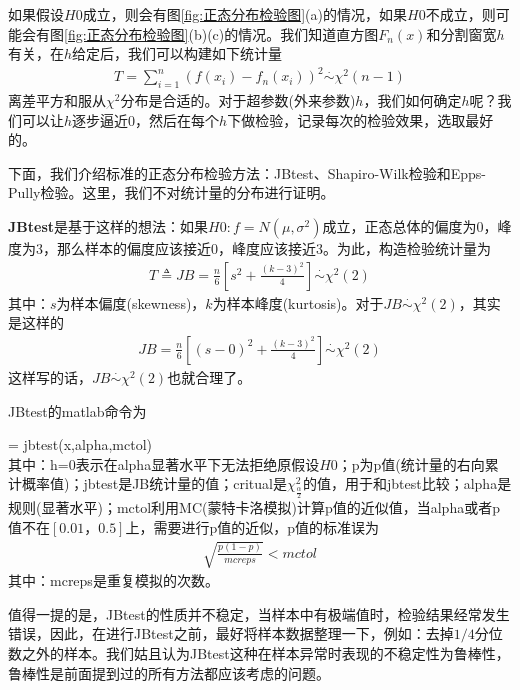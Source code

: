         如果假设$H0$成立，则会有图\ref{fig:正态分布检验图}(a)的情况，如果$H0$不成立，则可能会有图\ref{fig:正态分布检验图}(b)(c)的情况。我们知道直方图$F_n(x)$和分割窗宽$h$有关，在$h$给定后，我们可以构建如下统计量
        \begin{align*}
        T = \sum_{i = 1}^n \left( f(x_i) - f_n(x_i) \right) ^2 \overset{\cdot}{\sim} \chi^2(n-1)
        \end{align*}
        离差平方和服从$\chi^2$分布是合适的。对于超参数(外来参数)$h$，我们如何确定$h$呢？我们可以让$h$逐步逼近0，然后在每个$h$下做检验，记录每次的检验效果，选取最好的。
        \par
        下面，我们介绍标准的正态分布检验方法：JBtest、Shapiro-Wilk检验和Epps-Pully检验。这里，我们不对统计量的分布进行证明。
        \par
        \textbf{JBtest}是基于这样的想法：如果$H0:f = N(\mu,\sigma^2)$成立，正态总体的偏度为0，峰度为3，那么样本的偏度应该接近0，峰度应该接近3。为此，构造检验统计量为
        \begin{align*}
        T \triangleq JB = \frac{n}{6}\left[ s^2+\frac{(k-3)^2}{4}  \right] \overset{\cdot}{\sim} \chi^2(2)
        \end{align*}
        其中：$s$为样本偏度(skewness)，$k$为样本峰度(kurtosis)。对于$JB\overset{\cdot}{\sim} \chi^2(2)$，其实是这样的
        \begin{align*}
        JB = \frac{n}{6}\left[ (s-0)^2+\frac{(k-3)^2}{4}  \right] \overset{\cdot}{\sim} \chi^2(2)
        \end{align*}
        这样写的话，$JB\overset{\cdot}{\sim} \chi^2(2)$也就合理了。
        \par
        JBtest的matlab命令为
        \par
        [h,p,jbtest,critral] = jbtest(x,alpha,mctol)\\
        其中：h=0表示在alpha显著水平下无法拒绝原假设$H0$；p为p值(统计量的右向累计概率值)；jbtest是JB统计量的值；critual是$\chi^2_{\frac{\alpha}{2}}$的值，用于和jbtest比较；alpha是规则(显著水平)；mctol利用MC(蒙特卡洛模拟)计算p值的近似值，当alpha或者p值不在$[0.01，0.5]$上，需要进行p值的近似，p值的标准误为
        \begin{align*}
        \sqrt{\frac{p(1-p)}{mcreps}} <mctol
        \end{align*}
        其中：mcreps是重复模拟的次数。
        \par
        值得一提的是，JBtest的性质并不稳定，当样本中有极端值时，检验结果经常发生错误，因此，在进行JBtest之前，最好将样本数据整理一下，例如：去掉$1/4$分位数之外的样本。我们姑且认为JBtest这种在样本异常时表现的不稳定性为鲁棒性，鲁棒性是前面提到过的所有方法都应该考虑的问题。
